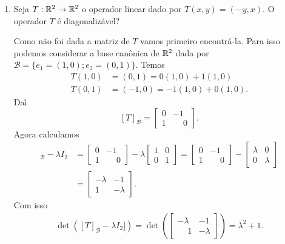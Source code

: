 \begin{exemplo}
    \begin{enumerate}[label={\arabic*})]
        \item Seja $T : \mathbb{R}^2 \to \mathbb{R}^2$ o operador linear dado por $T(x,y) = (-y,x)$. O operador $T$ é diagonalizável?
        \begin{solucao}
            Como não foi dada a matriz de $T$ vamos primeiro encontrá-la. Para isso podemos considerar a base can\^onica de $\mathbb{R}^2$ dada por $\mathcal{B} = \{e_1 = (1,0); e_2 = (0,1)\}$. Temos
            \begin{align}
                T(1,0) &= (0,1) = 0(1,0) + 1(1,0)\\
                T(0,1) &= (-1,0) = -1(1,0) + 0(1,0).
            \end{align}
            Da{\'\i}
            \[
                [T]_\mathcal{B} = \begin{bmatrix}0 & -1\\ 1 & \phantom{-}0\end{bmatrix}.
            \]
            Agora calculamos
            \begin{align*}
                [T]_\mathcal{B} - \lambda I_2 &= \begin{bmatrix}0 & -1\\ 1 & \phantom{-}0\end{bmatrix} - \lambda\begin{bmatrix}1 & 0\\0 & 1\end{bmatrix} = \begin{bmatrix}0 & -1\\ 1 & \phantom{-}0\end{bmatrix} - \begin{bmatrix}\lambda & 0\\0 & \lambda\end{bmatrix}\\ &= \begin{bmatrix}-\lambda & -1\\ 1 & -\lambda\end{bmatrix}.
            \end{align*}
            Com isso
            \begin{align*}
                \det([T]_\mathcal{B} - \lambda I_2]) = \det\left(\begin{bmatrix} -\lambda & -1\\\phantom{-}1 & -\lambda\end{bmatrix}\right) = \lambda^2 + 1.
            \end{align*}

\end{solucao}
\end{enumerate}
\end{exemplo}
